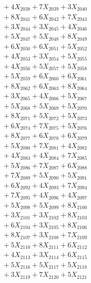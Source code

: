 \documentclass[a4paper,10pt]{article}
\begin{document}
{\begin{align}
&\;  + 4 X_{2038} + 7 X_{2039} + 3 X_{2040} \\[0.3ex]
&\;  + 8 X_{2041} + 6 X_{2042} + 7 X_{2043} \\[0.3ex]
&\;  + 3 X_{2044} + 3 X_{2045} + 4 X_{2046} \\[0.3ex]
&\;  + 5 X_{2047} + 5 X_{2048} + 8 X_{2049} \\[0.5ex]\allowbreak
&\;  + 6 X_{2050} + 6 X_{2051} + 5 X_{2052} \\[0.3ex]
&\;  + 4 X_{2053} + 3 X_{2054} + 5 X_{2055} \\[0.3ex]
&\;  + 4 X_{2056} + 5 X_{2057} + 5 X_{2058} \\[0.3ex]
&\;  + 5 X_{2059} + 6 X_{2060} + 6 X_{2061} \\[0.3ex]
&\;  + 8 X_{2062} + 6 X_{2063} + 8 X_{2064} \\[0.3ex]
&\;  + 3 X_{2065} + 4 X_{2066} + 5 X_{2067} \\[0.3ex]
&\;  + 5 X_{2068} + 5 X_{2069} + 5 X_{2070} \\[0.3ex]
&\;  + 8 X_{2071} + 5 X_{2072} + 5 X_{2073} \\[0.3ex]
&\;  + 6 X_{2074} + 7 X_{2075} + 5 X_{2076} \\[0.3ex]
&\;  + 8 X_{2077} + 6 X_{2078} + 6 X_{2079} \\[0.5ex]\allowbreak
&\;  + 5 X_{2080} + 7 X_{2081} + 4 X_{2082} \\[0.3ex]
&\;  + 4 X_{2083} + 4 X_{2084} + 7 X_{2085} \\[0.3ex]
&\;  + 5 X_{2086} + 7 X_{2087} + 6 X_{2088} \\[0.3ex]
&\;  + 7 X_{2089} + 5 X_{2090} + 5 X_{2091} \\[0.3ex]
&\;  + 6 X_{2092} + 4 X_{2093} + 7 X_{2094} \\[0.3ex]
&\;  + 7 X_{2095} + 4 X_{2096} + 4 X_{2097} \\[0.3ex]
&\;  + 5 X_{2098} + 5 X_{2099} + 8 X_{2100} \\[0.3ex]
&\;  + 3 X_{2101} + 3 X_{2102} + 8 X_{2103} \\[0.3ex]
&\;  + 6 X_{2104} + 3 X_{2105} + 8 X_{2106} \\[0.3ex]
&\;  + 8 X_{2107} + 3 X_{2108} + 7 X_{2109} \\[0.5ex]\allowbreak
&\;  + 5 X_{2110} + 8 X_{2111} + 6 X_{2112} \\[0.3ex]
&\;  + 4 X_{2113} + 3 X_{2114} + 6 X_{2115} \\[0.3ex]
&\;  + 5 X_{2116} + 5 X_{2117} + 5 X_{2118} \\[0.3ex]
&\;  + 3 X_{2119} + 7 X_{2120} + 5 X_{2121} \\[0.3ex]

\end{align}}
\end{document}

